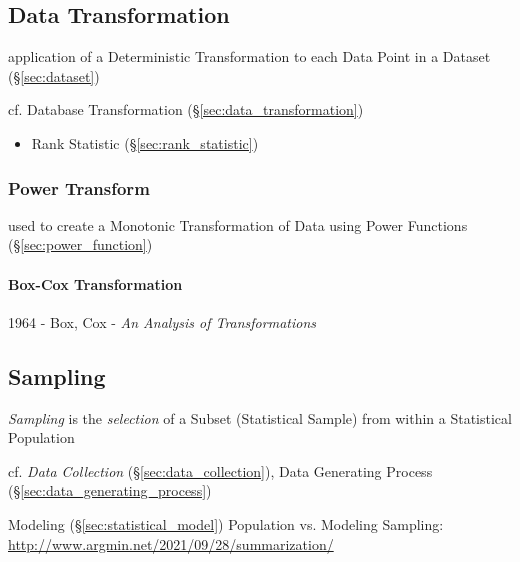 \subsection{Data Transformation}\label{sec:dataset_transformation}

application of a Deterministic Transformation to each Data Point in a Dataset
(\S\ref{sec:dataset})

\fist cf. Database Transformation (\S\ref{sec:data_transformation})

\begin{itemize}
  \item Rank Statistic (\S\ref{sec:rank_statistic})
\end{itemize}



\subsubsection{Power Transform}\label{sec:power_transform}

used to create a Monotonic Transformation of Data using Power Functions
(\S\ref{sec:power_function})



\paragraph{Box-Cox Transformation}\label{sec:boxcox_transformation}\hfill

1964 - Box, Cox - \emph{An Analysis of Transformations}



\subsection{Sampling}\label{sec:sampling}

\emph{Sampling} is the \emph{selection} of a Subset (Statistical Sample) from
within a Statistical Population

\fist cf. \emph{Data Collection} (\S\ref{sec:data_collection}), Data Generating
Process (\S\ref{sec:data_generating_process})

\fist Modeling (\S\ref{sec:statistical_model}) Population vs. Modeling Sampling:
\url{http://www.argmin.net/2021/09/28/summarization/}

